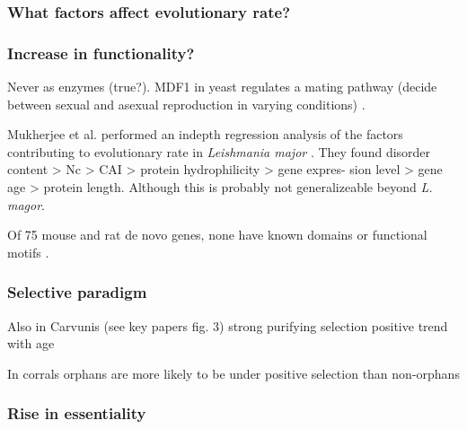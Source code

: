   \subsubsection{What factors affect evolutionary rate?}

  \subsubsection{Increase in functionality?}

    Never as enzymes (true?). MDF1 in yeast regulates a mating pathway
    (decide between sexual and asexual reproduction in varying conditions)
    \cite{li_novo_2010}.

    Mukherjee et al. performed an indepth regression analysis of the factors
    contributing to evolutionary rate in \textit{Leishmania major}
    \cite{mukherjee_elucidating_2015}. They found disorder content > Nc > CAI >
    protein hydrophilicity > gene expres- sion level > gene age > protein length.
    Although this is probably not generalizeable beyond \textit{L.  magor}.

    Of 75 mouse and rat de novo genes, none have known domains or
    functional motifs \cite{murphy_novo_2012}.

  \subsubsection{Selective paradigm}


    Also in Carvunis (see key papers fig. 3) strong purifying selection
    positive trend with age \cite{carvunis_proto-genes_2012}


    In corrals orphans are more likely to be under positive selection
    than non-orphans \cite{voolstra_rapid_2011}


    \FloatBarrier

  \subsubsection{Rise in essentiality}

